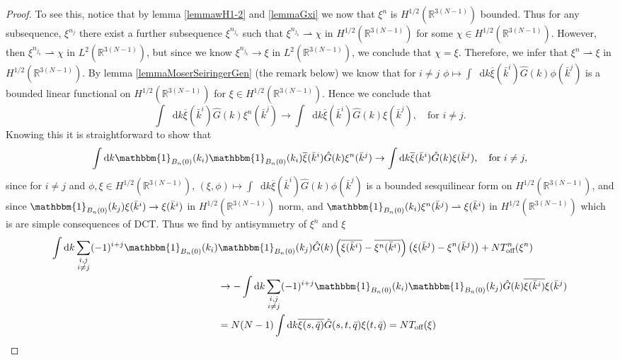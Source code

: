 \documentclass[a4paper,11pt]{article}
\newcommand*\diff{\mathop{}\!\mathrm{d}}
\newcommand{\R}{\mathbb{R}}
\numberwithin{equation}{section}
\begin{document}
\begin{proof}
To see this, notice that by lemma \ref{lemmawH1-2} and \ref{lemmaGxi} we now that $ \xi^n $ is $ H^{1/2}(\R^{3(N-1)}) $ bounded. Thus for any subsequence, $ \xi^{n_j} $ there exist a further subsequence $ \xi^{n_{j_k}} $ such that $ \xi^{n_{j_k}} \rightharpoonup \chi  $ in $ H^{1/2}(\R^{3(N-1)}) $ for some $ \chi\in H^{1/2}(\R^{3(N-1)}) $. However, then $ \xi^{n_{j_k}} \rightharpoonup \chi $ in $ L^{2}(\R^{3(N-1)}) $, but since we know $ \xi^{n_{j_k}} \to \xi $ in $ L^{2}(\R^{3(N-1)}) $, we conclude that $ \chi=\xi $. Therefore, we infer that $ \xi^n\rightharpoonup\xi $ in $ H^{1/2}(\R^{3(N-1)}) $. By lemma \ref{lemmaMoserSeiringerGen} (the remark below) we know that for $ i\neq j $ $ \phi\mapsto \int\diff k\overline{\xi}(\bar{k}^i)\hat{G}(k)\phi(\bar{k}^j)$ is a bounded linear functional on $ H^{1/2}(\R^{3(N-1)}) $ for $ \xi\in H^{1/2}(\R^{3(N-1)})  $. Hence we conclude that \begin{equation}
\int\diff k\overline{\xi}(\bar{k}^i)\hat{G}(k)\xi^n(\bar{k}^j)\to\int\diff k\overline{\xi}(\bar{k}^i)\hat{G}(k)\xi(\bar{k}^j),\quad\text{for }i\neq j.
\end{equation}
Knowing this it is straightforward to show that \begin{equation}
\int\diff k\mathbbm{1}_{B_n(0)}(k_i)\mathbbm{1}_{B_n(0)}(k_i)\overline{\xi}(\bar{k}^i)\hat{G}(k)\xi^n(\bar{k}^j)\to\int\diff k\overline{\xi}(\bar{k}^i)\hat{G}(k)\xi(\bar{k}^j),\quad\text{for }i\neq j,
\end{equation}
since for $ i\neq j $ and $ \phi,\xi\in H^{1/2}(\R^{3(N-1)}) $, $ (\xi,\phi)\mapsto \int\diff k\overline{\xi}(\bar{k}^i)\hat{G}(k)\phi(\bar{k}^j)$ is a bounded sesquilinear form on $ H^{1/2}(\R^{3(N-1)}) $, and since $ \mathbbm{1}_{B_n(0)}(k_j)\xi(\bar{k}^i)\to\xi(\bar{k}^i) $ in $ H^{1/2}(\R^{3(N-1)}) $ norm, and $ \mathbbm{1}_{B_n(0)}(k_i)\xi^n(\bar{k}^j)\rightharpoonup\xi(\bar{k}^i) $ in $ H^{1/2}(\R^{3(N-1)}) $ which is are simple consequences of DCT. Thus we find by antisymmetry of $ \xi^n $ and $ \xi $\begin{equation}\label{EqConOff}
\begin{aligned}
\int\diff k\sum_{\substack{i,j\\i\neq j}}(-1)^{i+j}\mathbbm{1}_{B_n(0)}(k_i)&\mathbbm{1}_{B_n(0)}(k_j)\hat{G}(k)\left(\overline{\xi(\bar{k}^i)}-\overline{\xi^n(\bar{k}^i)}\right)\left(\xi(\bar{k}^j)-\xi^n(\bar{k}^j)\right)+NT^n_{\text{off}}(\xi^n)\\
&\to -\int\diff k\sum_{\substack{i,j\\i\neq j}}(-1)^{i+j}\mathbbm{1}_{B_n(0)}(k_i)\mathbbm{1}_{B_n(0)}(k_j)\hat{G}(k)\overline{\xi(\bar{k}^i)}\xi(\bar{k}^j)\\&=N(N-1)\int\diff k \overline{\xi(s,\bar{q})}\hat{G}(s,t,\bar{q})\xi(t,\bar{q})=NT_{\text{off}}(\xi)

\end{aligned}
\end{equation}
\end{proof}
\end{document}
